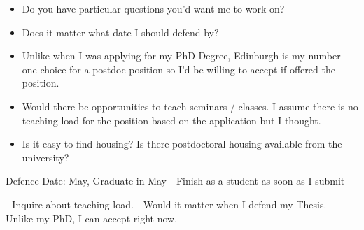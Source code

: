 \documentclass[11pt]{article}
\begin{document}
\begin{itemize}
    \item Do you have particular questions you'd want me to work on?
    \item Does it matter what date I should defend by?
    \item Unlike when I was applying for my PhD Degree, Edinburgh is my number one choice for a postdoc position so I'd be willing to accept if offered the position.
    \item Would there be opportunities to teach seminars / classes. I assume there is no teaching load for the position based on the application but I thought.
    \item Is it easy to find housing? Is there postdoctoral housing available from the university?
\end{itemize}


Defence Date: May, Graduate in May
- Finish as a student as soon as I submit

- Inquire about teaching load.
- Would it matter when I defend my Thesis.
- Unlike my PhD, I can accept right now.
\end{document}
